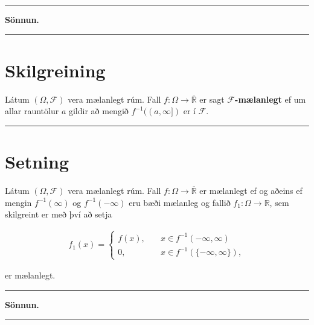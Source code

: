 \documentclass[]{book}
\begin{document}
\begin{center}\rule{0.5\linewidth}{\linethickness}\end{center}

\textbf{Sönnun.}

\begin{center}\rule{0.5\linewidth}{\linethickness}\end{center}

\hypertarget{skilgreining-15}{%
\section{Skilgreining}\label{skilgreining-15}}

Látum \((\Omega, \mathcal F)\) vera mælanlegt rúm. Fall \(f: \Omega \rightarrow \overline{\mathbb R}\) er sagt \(\mathcal F\)\textbf{-mælanlegt} ef um allar rauntölur \(a\) gildir að mengið \(f^{-1}((a,\infty])\) er í \(\mathcal F\).

\begin{center}\rule{0.5\linewidth}{\linethickness}\end{center}

\hypertarget{setning-40}{%
\section{Setning}\label{setning-40}}

Látum \((\Omega, \mathcal F)\) vera mælanlegt rúm. Fall \(f: \Omega \rightarrow \overline{\mathbb R}\) er mælanlegt ef og aðeins ef mengin \(f^{-1}(\infty)\) og \(f^{-1}(-\infty)\) eru bæði mælanleg og fallið \(f_1: \Omega\rightarrow\mathbb R\), sem skilgreint er með því að setja

\[
\begin{aligned}
f_1(x) = 
\begin{cases}
f(x), \quad &x\in f^{-1}(-\infty, \infty) \\
0, \quad &x\in f^{-1}(\{-\infty, \infty\}),
\end{cases}
\end{aligned}
\]

er mælanlegt.

\begin{center}\rule{0.5\linewidth}{\linethickness}\end{center}

\textbf{Sönnun.}

\begin{center}\rule{0.5\linewidth}{\linethickness}\end{center}
\end{document}

